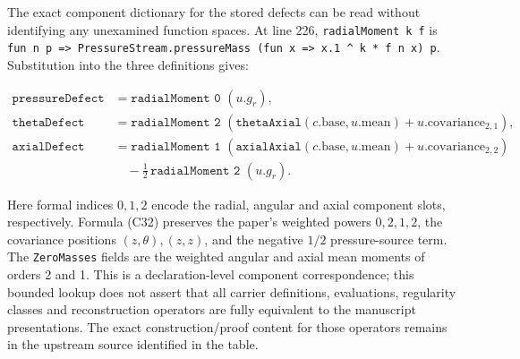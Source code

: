 \documentclass[10pt,a4paper]{article}
\begin{document}
The exact component dictionary for the stored defects can be read without identifying any unexamined function spaces. At line 226, \texttt{radialMoment\ k\ f} is \texttt{f\allowbreak{}u\allowbreak{}n\allowbreak{}\ \allowbreak{}n\allowbreak{}\ \allowbreak{}p\allowbreak{}\ \allowbreak{}=\allowbreak{}\textgreater{}\allowbreak{}\ \allowbreak{}P\allowbreak{}r\allowbreak{}e\allowbreak{}s\allowbreak{}s\allowbreak{}u\allowbreak{}r\allowbreak{}e\allowbreak{}S\allowbreak{}t\allowbreak{}r\allowbreak{}e\allowbreak{}a\allowbreak{}m\allowbreak{}.\allowbreak{}p\allowbreak{}r\allowbreak{}e\allowbreak{}s\allowbreak{}s\allowbreak{}u\allowbreak{}r\allowbreak{}e\allowbreak{}M\allowbreak{}a\allowbreak{}s\allowbreak{}s\allowbreak{}\ \allowbreak{}(\allowbreak{}f\allowbreak{}u\allowbreak{}n\allowbreak{}\ \allowbreak{}x\allowbreak{}\ \allowbreak{}=\allowbreak{}\textgreater{}\allowbreak{}\ \allowbreak{}x\allowbreak{}.\allowbreak{}1\allowbreak{}\ \allowbreak{}\^{}\allowbreak{}\ \allowbreak{}k\allowbreak{}\ \allowbreak{}*\allowbreak{}\ \allowbreak{}f\allowbreak{}\ \allowbreak{}n\allowbreak{}\ \allowbreak{}x\allowbreak{})\allowbreak{}\ \allowbreak{}p}. Substitution into the three definitions gives:

\[
\begin{aligned}
\texttt{pressureDefect}&=\texttt{radialMoment 0 }(u.g_r),\\
\texttt{thetaDefect}&=\texttt{radialMoment 2 }
  (\texttt{thetaAxial}(c.\mathrm{base},u.\mathrm{mean})+u.\mathrm{covariance}_{2,1}),\\
\texttt{axialDefect}&=\texttt{radialMoment 1 }
  (\texttt{axialAxial}(c.\mathrm{base},u.\mathrm{mean})+u.\mathrm{covariance}_{2,2})\\
  &\quad{}
  -\tfrac12\,\texttt{radialMoment 2 }(u.g_r).
\end{aligned}
\tag{C32}
\]

Here formal indices \(0,1,2\) encode the radial, angular and axial component slots, respectively. Formula (C32) preserves the paper's weighted powers \(0,2,1,2\), the covariance positions \((z,\theta),(z,z)\), and the negative \(1/2\) pressure-source term. The \texttt{ZeroMasses} fields are the weighted angular and axial mean moments of orders 2 and 1. This is a declaration-level component correspondence; this bounded lookup does not assert that all carrier definitions, evaluations, regularity classes and reconstruction operators are fully equivalent to the manuscript presentations. The exact construction/proof content for those operators remains in the upstream source identified in the table.
\end{document}
